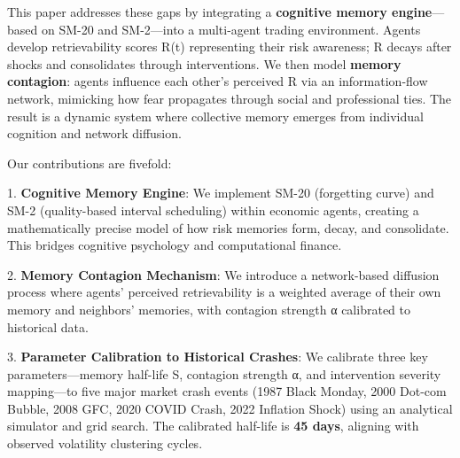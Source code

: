 \documentclass[11pt]{article}
\begin{document}
This paper addresses these gaps by integrating a \textbf{cognitive memory engine}—based on SM-20 and SM-2—into a multi-agent trading environment. Agents develop retrievability scores R(t) representing their risk awareness; R decays after shocks and consolidates through interventions. We then model \textbf{memory contagion}: agents influence each other's perceived R via an information-flow network, mimicking how fear propagates through social and professional ties. The result is a dynamic system where collective memory emerges from individual cognition and network diffusion.

Our contributions are fivefold:

1. \textbf{Cognitive Memory Engine}: We implement SM-20 (forgetting curve) and SM-2 (quality-based interval scheduling) within economic agents, creating a mathematically precise model of how risk memories form, decay, and consolidate. This bridges cognitive psychology and computational finance.

2. \textbf{Memory Contagion Mechanism}: We introduce a network-based diffusion process where agents' perceived retrievability is a weighted average of their own memory and neighbors' memories, with contagion strength α calibrated to historical data.

3. \textbf{Parameter Calibration to Historical Crashes}: We calibrate three key parameters—memory half-life S, contagion strength α, and intervention severity mapping—to five major market crash events (1987 Black Monday, 2000 Dot-com Bubble, 2008 GFC, 2020 COVID Crash, 2022 Inflation Shock) using an analytical simulator and grid search. The calibrated half-life is \textbf{45 days}, aligning with observed volatility clustering cycles.
\end{document}
